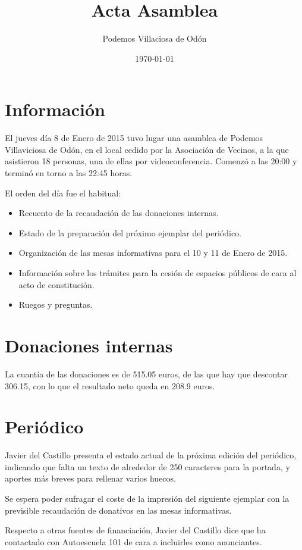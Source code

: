 \documentclass[11pt]{article}
\author{Podemos Villaciosa de Odón}
\date{\today}
\title{Acta Asamblea}
\begin{document}
\maketitle
\tableofcontents

\section{Información}
\label{sec-1}
El jueves día 8 de Enero de 2015 tuvo lugar una asamblea de Podemos Villaviciosa de Odón, en el local cedido por la Asociación de Vecinos, a la que asistieron 18 personas, una de ellas por videoconferencia.
Comenzó a las 20:00 y terminó en torno a las 22:45 horas.

El orden del día fue el habitual:
\begin{itemize}
\item Recuento de la recaudación de las donaciones internas.
\item Estado de la preparación del próximo ejemplar del periódico.
\item Organización de las mesas informativas para el 10 y 11 de Enero de 2015.
\item Información sobre los trámites para la cesión de espacios públicos de cara al acto de constitución.
\item Ruegos y preguntas.
\end{itemize}

\section{Donaciones internas}
\label{sec-2}

La cuantía de las donaciones es de 515.05 euros, de las que hay que descontar 306.15, con lo que el resultado neto queda en 208.9 euros.

\section{Periódico}
\label{sec-3}

Javier del Castillo presenta el estado actual de la próxima edición del periódico, indicando que falta un texto de alrededor de 250 caracteres para la portada, y aportes más breves para rellenar varios huecos.

Se espera poder sufragar el coste de la impresión del siguiente ejemplar con la previsible recaudación de donativos en las mesas informativas.

Respecto a otras fuentes de financiación, Javier del Castillo dice que ha contactado con Autoescuela 101 de cara a incluirles como anunciantes.
\end{document}
